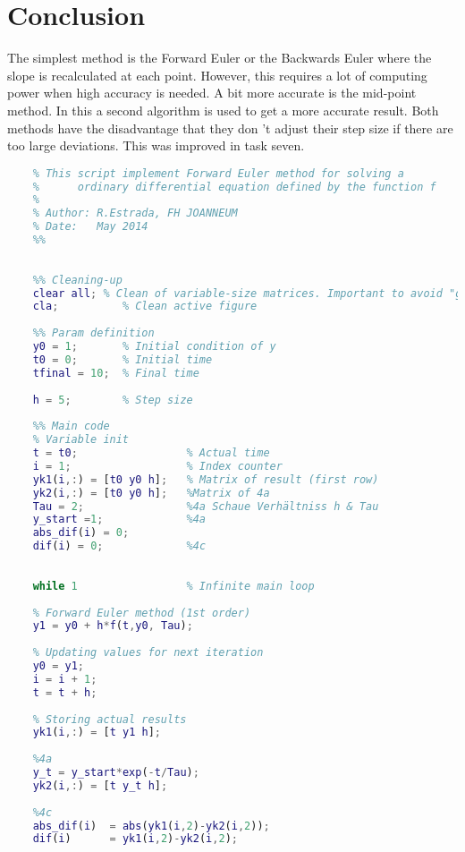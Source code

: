 \part{Conclusion}
The simplest method is the Forward Euler or the Backwards Euler where the slope is recalculated at each point. However, this requires a lot of computing power when high accuracy is needed.
A bit more accurate is the mid-point method. In this a second algorithm is used to get a more accurate result.
Both methods have the disadvantage that they don 't adjust their step size if there are too large deviations. This was improved in task seven.


\newpage

\begin{appendices}

\begin{lstlisting}[caption={$test\_ode1$}, language=matlab, backgroundcolor = \color{lgray}, label={lst:ode1}]
	%%
	% This script implement Forward Euler method for solving a 
	%      ordinary differential equation defined by the function f
	%
	% Author: R.Estrada, FH JOANNEUM
	% Date:   May 2014
	%%
	
	
	%% Cleaning-up
	clear all; % Clean of variable-size matrices. Important to avoid "ghost" values
	cla;          % Clean active figure  
	
	%% Param definition
	y0 = 1;       % Initial condition of y
	t0 = 0;       % Initial time  
	tfinal = 10;  % Final time
	
	h = 5;        % Step size
	
	%% Main code
	% Variable init
	t = t0;                 % Actual time 
	i = 1;                  % Index counter 
	yk1(i,:) = [t0 y0 h];   % Matrix of result (first row)
	yk2(i,:) = [t0 y0 h];   %Matrix of 4a
	Tau = 2;                %4a Schaue Verhältniss h & Tau
	y_start =1;             %4a 
	abs_dif(i) = 0;
	dif(i) = 0;             %4c
	
	
	while 1                 % Infinite main loop
	
	% Forward Euler method (1st order)
	y1 = y0 + h*f(t,y0, Tau);
	
	% Updating values for next iteration
	y0 = y1;            
	i = i + 1;
	t = t + h;
	
	% Storing actual results
	yk1(i,:) = [t y1 h];
	
	%4a
	y_t = y_start*exp(-t/Tau);
	yk2(i,:) = [t y_t h]; 
	
	%4c
	abs_dif(i)  = abs(yk1(i,2)-yk2(i,2));
	dif(i)      = yk1(i,2)-yk2(i,2);
	

\end{lstlisting}
\end{appendices}
